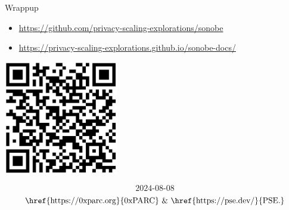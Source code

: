 \documentclass[t]{beamer}
\begin{document}
\begin{frame}{Wrappup}
\begin{itemize}
  \item \href{https://github.com/privacy-scaling-explorations/sonobe}{https://github.com/privacy-scaling-explorations/sonobe}
  \item \href{https://privacy-scaling-explorations.github.io/sonobe-docs/}{https://privacy-scaling-explorations.github.io/sonobe-docs/}
\end{itemize}

  \begin{center}
    \includegraphics[width=5cm]{./imgs/sonobe-link-qrcode}
  \end{center}

\tiny{
  $$\text{2024-08-08}$$
  $$\text{\href{https://0xparc.org}{0xPARC}~\&~\href{https://pse.dev/}{PSE.}}$$
}
\end{frame}
\end{document}
